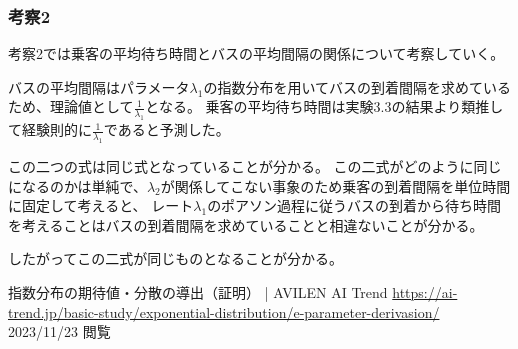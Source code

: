\documentclass[a4paper,11pt,dvipdfmx]{jsarticle}
\begin{document}
\subsubsection{考察2}
考察2では乗客の平均待ち時間とバスの平均間隔の関係について考察していく。

バスの平均間隔はパラメータ$\lambda_1$の指数分布を用いてバスの到着間隔を求めているため、理論値として$\frac{1}{\lambda_1}$となる。
乗客の平均待ち時間は実験3.3の結果より類推して経験則的に$\frac{1}{\lambda_1}$であると予測した。

この二つの式は同じ式となっていることが分かる。
この二式がどのように同じになるのかは単純で、$\lambda_2$が関係してこない事象のため乗客の到着間隔を単位時間に固定して考えると、
レート$\lambda_1$のポアソン過程に従うバスの到着から待ち時間を考えることはバスの到着間隔を求めていることと相違ないことが分かる。

したがってこの二式が同じものとなることが分かる。

\begin{thebibliography}{99}
     指数分布の期待値・分散の導出（証明） | AVILEN AI Trend \url{https://ai-trend.jp/basic-study/exponential-distribution/e-parameter-derivasion/} 2023/11/23 閲覧
\end{thebibliography}
\end{document}
